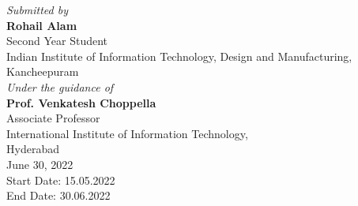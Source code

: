



\emph{Submitted by} \\[0.2in]
\textbf{Rohail Alam}\\
Second Year Student\\
Indian Institute of Information Technology, Design and Manufacturing,\\Kancheepuram\\

\vspace{.2in}
\emph{Under the guidance of}\\[0.2in]
\textbf{Prof. Venkatesh Choppella}\\
Associate Professor\\
International Institute of Information Technology,\\Hyderabad\\

\vspace{1cm}
{\large June 30, 2022}\\[1cm] %
Start Date: 15.05.2022 \\
End Date: 30.06.2022 \\